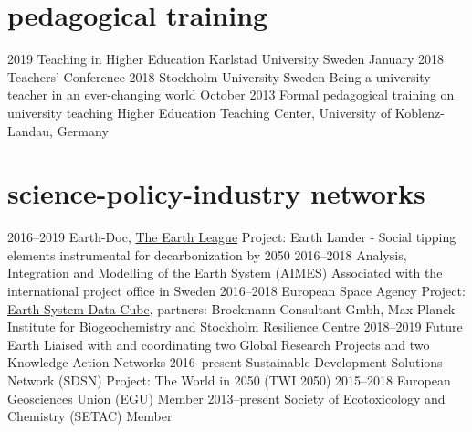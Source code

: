 \documentclass[]{friggeri-cv} %
\begin{document}
\section{pedagogical training}

\begin{entrylist}
\entry
{\small{2019}}
{Teaching in Higher Education}
{}
{Karlstad University Sweden}
\entry
{\small{January 2018}}
{Teachers' Conference 2018}
{Stockholm University Sweden}
{Being a university teacher in an ever-changing world}
\entry
{\small{October 2013}}
{Formal pedagogical training on university teaching}
{}
{Higher Education Teaching Center, University of Koblenz-Landau, Germany}
\end{entrylist}

\section{science-policy-industry networks}

\begin{entrylist}
\entry
{\small{2016--2019}}
{Earth-Doc, \href{http://www.the-earth-league.org/earth-doc-bios.html}{The Earth League}}
{}
{Project: Earth Lander - Social tipping elements instrumental for decarbonization by 2050}
\entry
{\small{2016--2018}}
{Analysis, Integration and Modelling of the Earth System (AIMES)}
{}
{Associated with the international project office in Sweden}
\entry
{\small{2016--2018}}
{European Space Agency}
{}
{Project: \href{http://earthsystemdatacube.net/}{Earth System Data Cube}, partners: Brockmann Consultant Gmbh, Max Planck Institute for Biogeochemistry and Stockholm Resilience Centre}
\entry
{\small{2018--2019}}
{Future Earth}
{}
{Liaised with and coordinating two Global Research Projects and two Knowledge Action Networks}
\entry
{\small{2016--present}}
{Sustainable Development Solutions Network (SDSN)}
{}
{Project: The World in 2050 (TWI 2050)}
\entry
{\small{2015--2018}}
{European Geosciences Union (EGU)}
{}
{Member}
\entry
{\small{2013--present}}
{Society of Ecotoxicology and Chemistry (SETAC)}
{}
{Member}
\end{entrylist}
\end{document}
